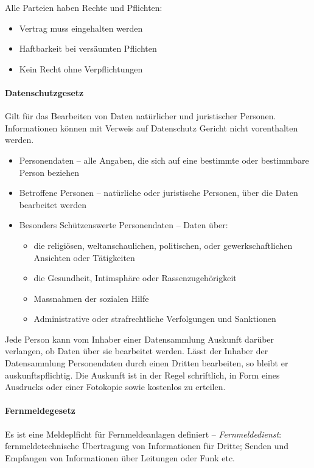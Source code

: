 \documentclass[a4paper,12pt]{article}
\begin{document}
Alle Parteien haben Rechte und Pflichten:
\begin{itemize}
\item Vertrag muss eingehalten werden
\item Haftbarkeit bei versäumten Pflichten
\item Kein Recht ohne Verpflichtungen
\end{itemize}



\paragraph{Datenschutzgesetz}  Gilt für das Bearbeiten von Daten natürlicher und juristischer Personen. Informationen können mit Verweis auf Datenschutz Gericht nicht vorenthalten werden.

\begin{itemize}
\item Personendaten -- alle Angaben, die sich auf eine bestimmte oder bestimmbare Person beziehen
\item Betroffene Personen -- natürliche oder juristische Personen, über die Daten bearbeitet werden
\item Besonders Schützenswerte Personendaten -- Daten über:
    \begin{itemize}
    \item die religiösen, weltanschaulichen, politischen, oder gewerkschaftlichen Ansichten oder Tätigkeiten
    \item die Gesundheit, Intimsphäre oder Rassenzugehörigkeit
    \item Massnahmen der sozialen Hilfe
    \item Administrative oder strafrechtliche Verfolgungen und Sanktionen
    \end{itemize}
\end{itemize}

Jede Person kann vom Inhaber einer Datensammlung Auskunft darüber verlangen, ob Daten über sie bearbeitet werden. Lässt der Inhaber der Datensammlung Personendaten durch einen Dritten bearbeiten, so bleibt er auskunftspflichtig. Die Auskunft ist in der Regel schriftlich, in Form eines Ausdrucks oder einer Fotokopie sowie kostenlos zu erteilen.


\paragraph{Fernmeldegesetz} Es ist eine Meldeplficht für Fernmeldeanlagen definiert -- \emph{Fernmeldedienst}: fernmeldetechnische Übertragung von Informationen für Dritte; Senden und Empfangen von Informationen über Leitungen oder Funk etc.
\end{document}
